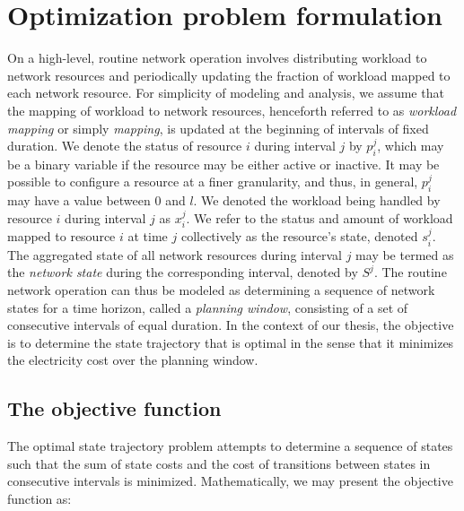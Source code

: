 \section{Optimization problem formulation}
\label{sec:framework:optimization}
On a high-level, routine network operation involves distributing workload to network resources and periodically updating the fraction of workload mapped to each network resource. For simplicity of modeling and analysis, we assume that the mapping of workload to network resources, henceforth referred to as \textit{workload mapping} or simply \textit{mapping}, is updated at the beginning of intervals of fixed duration. We denote the status of resource $i$ during interval $j$ by $p_i^j$, which may be a binary variable if the resource may be either active or inactive. It may be possible to configure a resource at a finer granularity, and thus, in general, $p_i^j$ may have a value between $0$ and $l$. We denoted the workload being handled by resource $i$ during interval $j$ as $x_i^j$. We refer to the status and amount of workload mapped to resource $i$ at time $j$ collectively as the resource's state, denoted $s_i^j$. The aggregated state of all network resources during interval $j$ may be termed as the \textit{network state} during the corresponding interval, denoted by $S^j$. The routine network operation can thus be modeled as determining a sequence of network states for a time horizon, called a \textit{planning window}, consisting of a set of consecutive intervals of equal duration. In the context of our thesis, the objective is to determine the state trajectory that is optimal in the sense that it minimizes the electricity cost over the planning window. %

\subsection{The objective function}
\label{subsec:framework:objective} %
The optimal state trajectory problem attempts to determine a sequence of states such that the sum of state costs and the cost of transitions between states in consecutive intervals is minimized. Mathematically, we may present the objective function as:


